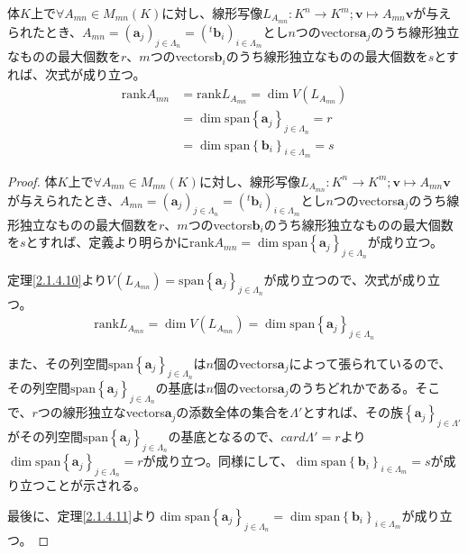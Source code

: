 \documentclass[dvipdfmx]{jsarticle}
\begin{document}
\begin{thm}\label{2.1.4.12}
体$K$上で$\forall A_{mn} \in M_{mn}(K)$に対し、線形写像$L_{A_{mn}}:K^{n} \rightarrow K^{m};\mathbf{v} \mapsto A_{mn}\mathbf{v}$が与えられたとき、$A_{mn} = \left( \mathbf{a}_{j} \right)_{j \in \varLambda_{n}} = \left(^{t}\mathbf{b}_{i} \right)_{i \in \varLambda_{m}}$とし$n$つのvectors$\mathbf{a}_{j}$のうち線形独立なものの最大個数を$r$、$m$つのvectors$\mathbf{b}_{i}$のうち線形独立なものの最大個数を$s$とすれば、次式が成り立つ。
\begin{align*}
{\mathrm{rank} }A_{mn} &= {\mathrm{rank} }L_{A_{mn}} = \dim{V\left( L_{A_{mn}} \right)}\\
&= \dim{{\mathrm{span} }\left\{ \mathbf{a}_{j} \right\}_{j \in \varLambda_{n}}} = r\\
&= \dim{{\mathrm{span} }\left\{ \mathbf{b}_{i} \right\}_{i \in \varLambda_{m}}} = s
\end{align*}
\end{thm}
\begin{proof}
体$K$上で$\forall A_{mn} \in M_{mn}(K)$に対し、線形写像$L_{A_{mn}}:K^{n} \rightarrow K^{m};\mathbf{v} \mapsto A_{mn}\mathbf{v}$が与えられたとき、$A_{mn} = \left( \mathbf{a}_{j} \right)_{j \in \varLambda_{n}} = \left(^{t}\mathbf{b}_{i} \right)_{i \in \varLambda_{m}}$とし$n$つのvectors$\mathbf{a}_{j}$のうち線形独立なものの最大個数を$r$、$m$つのvectors$\mathbf{b}_{i}$のうち線形独立なものの最大個数を$s$とすれば、定義より明らかに${\mathrm{rank} }A_{mn} = \dim{{\mathrm{span} }\left\{ \mathbf{a}_{j} \right\}_{j \in \varLambda_{n}}}$が成り立つ。\par
定理\ref{2.1.4.10}より$V\left( L_{A_{mn}} \right) = {\mathrm{span} }\left\{ \mathbf{a}_{j} \right\}_{j \in \varLambda_{n}}$が成り立つので、次式が成り立つ。
\begin{align*}
{\mathrm{rank} }L_{A_{mn}} = \dim{V\left( L_{A_{mn}} \right)} = \dim{{\mathrm{span} }\left\{ \mathbf{a}_{j} \right\}_{j \in \varLambda_{n}}}
\end{align*}\par
また、その列空間${\mathrm{span} }\left\{ \mathbf{a}_{j} \right\}_{j \in \varLambda_{n}}$は$n$個のvectors$\mathbf{a}_{j}$によって張られているので、その列空間${\mathrm{span} }\left\{ \mathbf{a}_{j} \right\}_{j \in \varLambda_{n}}$の基底は$n$個のvectors$\mathbf{a}_{j}$のうちどれかである。そこで、$r$つの線形独立なvectors$\mathbf{a}_{j}$の添数全体の集合を$\varLambda'$とすれば、その族$\left\{ \mathbf{a}_{j} \right\}_{j \in \varLambda'} $がその列空間${\mathrm{span} }\left\{ \mathbf{a}_{j} \right\}_{j \in \varLambda_{n}}$の基底となるので、${card}\varLambda' = r$より$\dim{{\mathrm{span} }\left\{ \mathbf{a}_{j} \right\}_{j \in \varLambda_{n}}} = r$が成り立つ。同様にして、$\dim{{\mathrm{span} }\left\{ \mathbf{b}_{i} \right\}_{i \in \varLambda_{m}}} = s$が成り立つことが示される。\par
最後に、定理\ref{2.1.4.11}より$\dim{{\mathrm{span} }\left\{ \mathbf{a}_{j} \right\}_{j \in \varLambda_{n}}} = \dim{{\mathrm{span} }\left\{ \mathbf{b}_{i} \right\}_{i \in \varLambda_{m}}}$が成り立つ。
\end{proof}
\end{document}

